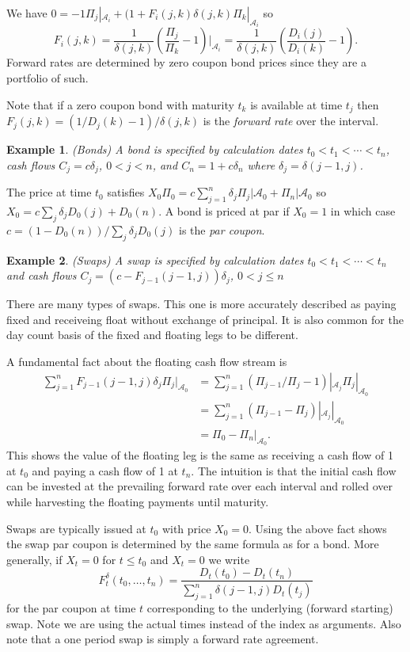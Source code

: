 \documentclass[fleqn]{amsart}
\renewcommand{\AA}{\mathcal{A}}
\newtheorem{example}{Example}
\begin{document}
We have \(0 = -1\Pi_j|_{\AA_i} + (1 + F_i(j,k)\delta(j,k)\Pi_k|_{\AA_i}\) so 
\[
F_i(j,k) = \frac{1}{\delta(j,k)}\left(\frac{\Pi_j}{\Pi_k} - 1\right)|_{\AA_i}
= \frac{1}{\delta(j,k)}\left(\frac{D_i(j)}{D_i(k)} - 1\right).
\] 
Forward rates are determined
by zero coupon bond prices since they are a portfolio of such.

Note that if a zero coupon bond with maturity \(t_k\) is available
at time \(t_j\) then \(F_j(j,k) = (1/D_j(k) - 1)/\delta(j,k)\) is
the {\em forward rate} over the interval.

\begin{example}{(Bonds)}
A bond is specified by {\em calculation dates} \(t_0 < t_1 <
\cdots < t_n\), cash flows
\(C_j = c \delta_j\), \(0 < j < n\), and
\(C_n = 1 + c \delta_n\) where \(\delta_j = \delta(j-1,j)\).
\end{example}
The price at time \(t_0\) satisfies \(X_0\Pi_0 = c\sum_{j=1}^n
\delta_j\Pi_j|{\AA_0} + \Pi_n|{\AA_0}\) so 
\(X_0 = c\sum_j \delta_jD_0(j) + D_0(n)\).
A bond is {priced at par} if \(X_0 = 1\) in which case
\(c = (1 - D_0(n))/\sum_j \delta_jD_0(j)\) is the {\em par coupon}.

\begin{example}{(Swaps)}
A swap is specified by calculation dates \(t_0 < t_1 <
\cdots < t_n\) and cash flows
\(C_j = (c - F_{j-1}(j-1,j)) \delta_j\), \(0 < j \le n\)
\end{example}
There are many types of swaps. This one is more accurately described
as paying fixed and receiveing float without exchange of principal.
It is also common for the day count basis of the fixed and
floating legs to be different.

A fundamental fact about the floating cash flow stream is
\begin{align*}
\sum_{j = 1}^n F_{j-1}(j-1,j) \delta_j \Pi_j|_{\AA_0}
&= \sum_{j = 1}^n (\Pi_{j-1}/\Pi_j - 1)|_{\AA_j} \Pi_j|_{\AA_0}\\
&= \sum_{j = 1}^n (\Pi_{j-1} - \Pi_j)|_{\AA_j}|_{\AA_0}\\
&= \Pi_0 - \Pi_n|_{\AA_0}.
\end{align*}
This shows the value of the floating leg is the same as
receiving a cash flow of 1 at \(t_0\) and paying a cash flow
of 1 at \(t_n\). The intuition is that the initial cash flow
can be invested at the prevailing forward rate over each
interval and rolled
over while harvesting the floating payments until maturity.

Swaps are typically issued at \(t_0\) with price \(X_0 = 0\).
Using the above fact shows the swap par coupon is determined
by the same formula as for a bond. More generally, if
\(X_t = 0\) for \(t\le t_0\) and \(X_t = 0\) we write
\[
F^\delta_t(t_0,\dots,t_n) = \frac{D_t(t_0) - D_t(t_n)}
{\sum_{j=1}^n \delta(j-1,j)D_t(t_j)}
\]
for the par coupon at time \(t\) corresponding to the
underlying (forward starting) swap. Note we are using
the actual times instead of the index as arguments.
Also note that a one period swap is simply a forward rate agreement.
\end{document}
